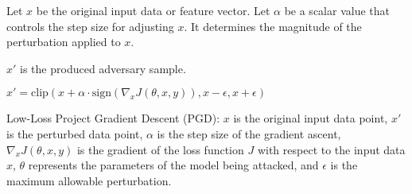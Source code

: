 Let $x$ be the original input data or feature vector. Let $\alpha$ be a scalar value that controls the step size for adjusting $x$. It determines the magnitude of the perturbation applied to $x$.

$x'$ is the produced adversary sample.

$x' = \text{clip}(x + \alpha \cdot \text{sign}(\nabla_x J(\theta, x, y)), x - \epsilon, x + \epsilon)$

Low-Loss Project Gradient Descent (PGD):
$x$ is the original input data point,
$x'$ is the perturbed data point,
$\alpha$ is the step size of the gradient ascent,
$\nabla_x J(\theta, x, y)$ is the gradient of the loss function $J$ with respect to the input data $x$,
$\theta$ represents the parameters of the model being attacked, and
$\epsilon$ is the maximum allowable perturbation.